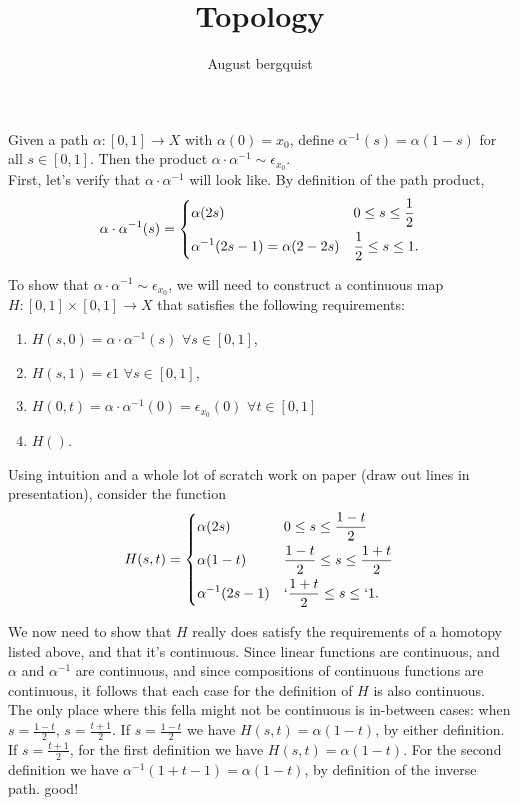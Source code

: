 \documentclass{article}
\title{Topology}
\author{August bergquist}
\newcommand{\inv}[1]{#1^{-1}}
\newcommand{\inv}[1]{#1^{-1}}
\begin{document}
\maketitle

 Given a path $\alpha:[0,1]\rightarrow X$ with $\alpha(0) = x_0$, define $\inv{\alpha}(s) = \alpha(1-s)$ for all $s\in [0,1]$. Then the product $\alpha\cdot \inv{\alpha} \sim \epsilon_{x_0} $.\\


 First, let's verify that $\alpha\cdot \inv\alpha$ will look like. By definition of the path product, 
$$ \alpha\cdot\inv\alpha(s) = 
\begin{dcases}
\alpha(2s) & 0\le s \le \frac{1}{2} \\
\inv{\alpha}(2s-1) = \alpha(2-2s) & \frac{1}{2} \le s \le 1.
\end{dcases}$$

To show that $\alpha\cdot\inv{\alpha} \sim \epsilon_{x_0}$, we will need to construct a continuous map $H : [0,1]\times[0,1]\rightarrow X$ that satisfies the following requirements:
\begin{enumerate}
    \item $H(s,0) = \alpha\cdot\inv{\alpha}(s)$ $\forall s\in [0,1]$,
    \item $H(s,1) = \epsilon{1}$ $\forall s\in [0,1]$,
    \item $H(0,t) = \alpha\cdot\inv{\alpha}(0) = \epsilon_{x_0}(0)$ $\forall t\in [0,1]$
    \item $H()$.
\end{enumerate}

Using intuition and a whole lot of scratch work on paper (draw out lines in presentation), consider the function 
$$
H(s,t) = 
\begin{dcases}
\alpha(2s) & 0\le s \le \frac{1-t}{2}\\
\alpha(1-t) & \frac{1-t}{2} \le s \le \frac{1+t}{2}\\
\inv{\alpha}(2s - 1) & `\frac{1+t}{2} \le s \le `1.
\end{dcases}$$

We now need to show that $H$ really does satisfy the requirements of a homotopy listed above, and that it's continuous. Since linear functions are continuous, and $\alpha$ and $\inv{\alpha}$ are continuous, and since compositions of continuous functions are continuous, it follows that each case for the definition of $H$ is also continuous. The only place where this fella might not be continuous is in-between cases: when $s = \frac{1-t}{2}$, $s = \frac{t+1}{2}$. If $ s = \frac{1-t}{2}$ we have $H(s,t) = \alpha(1-t)$, by either definition. If $s = \frac{t + 1}{2}$, for the first definition we have $H(s,t) = \alpha(1-t)$. For the second definition we have $\inv{\alpha}(1 + t - 1) = \alpha(1-t)$, by definition of the inverse path. good!\\
\end{document}
